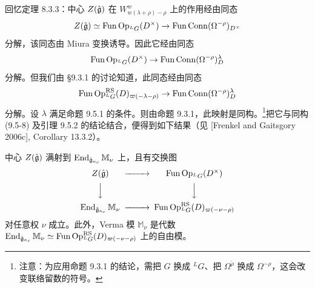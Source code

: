 回忆定理 8.3.3：中心 $Z(\hat{\mathfrak{g}})$ 在 $W^w_{w(\lambda+\rho)-\rho}$ 上的作用经由同态
\[
    Z(\hat{\mathfrak{g}})\simeq\operatorname{Fun}\operatorname{Op}_{{}^LG}(D^\times)\to\operatorname{Fun}\operatorname{Conn}(\Omega^{-\rho})_{D^\times}
\]
分解，该同态由 Miura 变换诱导。因此它经由同态
\[
    \operatorname{Fun}\operatorname{Op}_{{}^LG}(D^\times)\to\operatorname{Fun}\operatorname{Conn}(\Omega^{-\rho})^\lambda_D
\]
分解。但我们由 §9.3.1 的讨论知道，此同态经由同态
\[
    \operatorname{Fun}\operatorname{Op}^{\mathrm{RS}}_{{}^LG}(D)_{\varpi(-\lambda-\rho)}\to\operatorname{Fun}\operatorname{Conn}(\Omega^{-\rho})^\lambda_D
\]
分解。设 $\lambda$ 满足命题 9.5.1 的条件。则由命题 9.3.1，此映射是同构。\footnote{注意：为应用命题 9.3.1 的结论，需把 $G$ 换成 ${}^LG$、把 $\Omega^{\check\rho}$ 换成 $\Omega^{-\rho}$，这会改变联络留数的符号。}把它与同构 (9.5-8) 及引理 9.5.2 的结论结合，便得到如下结果（见 [Frenkel and Gaitsgory 2006c], Corollary 13.3.2）。

\begin{theorem}
    中心 $Z(\hat{\mathfrak{g}})$ 满射到 $\operatorname{End}_{\hat{\mathfrak{g}}_{\kappa_c}}\mathbb{M}_\nu$ 上，且有交换图
    \[
        \begin{CD}
            Z(\gghat) @>>> \operatorname{Fun}\Op_{{}^LG}(D^\times)\\
            @VVV @VVV\\
            \operatorname{End}_{\gghat_{\kappa_c}}\mathbb{M}_\nu @>>>
                \operatorname{Fun}\Op^{\mathrm{RS}}_{{}^LG}(D)_{\varpi(-\nu-\rho)}
        \end{CD}
    \]
    对任意权 $\nu$ 成立。此外，Verma 模 $\mathbb{M}_\nu$ 是代数 $\operatorname{End}_{\hat{\mathfrak{g}}_{\kappa_c}}\mathbb{M}_\nu\simeq\operatorname{Fun}\operatorname{Op}^{\mathrm{RS}}_{{}^LG}(D)_{\varpi(-\nu-\rho)}$ 上的自由模。
\end{theorem}


